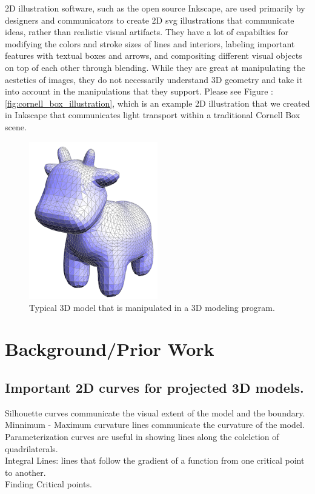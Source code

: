 \documentclass[12pt, letterpaper]{article}
\begin{document}
		2D illustration software, such as the open source Inkscape, are used primarily by designers and communicators to create 2D svg illustrations that
		communicate ideas, rather than realistic visual artifacts. They have a lot of capabilties for modifying the colors and stroke sizes of lines and interiors,
		labeling important features with textual boxes and arrows, and compositing different visual objects on top of each other through blending.
		While they are great at manipulating the aestetics of images, they do not necessarily understand 3D geometry and take it into account in the manipulations
		that they support. Please see Figure : \ref{fig:cornell_box_illustration}, which is an example 2D illustration that we created in Inkscape that communicates light transport within a traditional Cornell Box scene.

		\begin{figure}[h]
		\centering
		\includegraphics[width=0.5\textwidth]{KeenanCow}
		\caption{Typical 3D model that is manipulated in a 3D modeling program.}
		\label{fig:keenan_cow}
		\end{figure}


\section{Background/Prior Work}

	
	\subsection{Important 2D curves for projected 3D models.}
	
		Silhouette curves communicate the visual extent of the model and the boundary.\\
		Minnimum - Maximum curvature lines communicate the curvature of the model.\\
		Parameterization curves are useful in showing lines along the colelction of quadrilaterals.\\
		Integral Lines: lines that follow the gradient of a function from one critical point to another.\\
		Finding Critical points.\\
\end{document}
